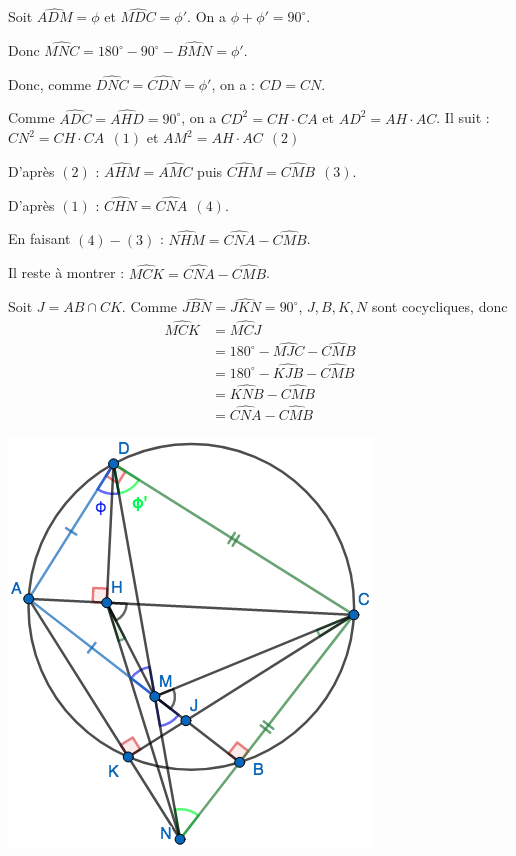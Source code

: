 Soit $\widehat{ADM} = \phi$ et $\widehat{MDC}=\phi'$. On a $\phi + \phi' = 90^\circ$.

Donc $\widehat{MNC} = 180^\circ - 90^\circ - \widehat{BMN} = \phi'$.

Donc, comme $\widehat{DNC} = \widehat{CDN} = \phi'$, on a : $CD = CN$.

Comme $\widehat{ADC} = \widehat{AHD} = 90^\circ$, on a $CD^2=CH\cdot CA$ et $AD^2 = AH\cdot AC$. Il suit : $CN^2 = CH\cdot CA ~~(1)$ et $AM^2 = AH\cdot AC~~(2)$

D'après $(2)$ : $\widehat{AHM} = \widehat{AMC}$ puis $\widehat{CHM} = \widehat{CMB}~~(3)$.

D'après $(1)$ : $\widehat{CHN} = \widehat{CNA}~~(4)$.

En faisant $(4)-(3)$ : $\widehat{NHM} = \widehat{CNA} - \widehat{CMB}$.

Il reste à montrer : $\widehat{MCK} = \widehat{CNA} - \widehat{CMB}$.

Soit $J=AB\cap CK$. Comme $\widehat{JBN} = \widehat{JKN} = 90^\circ$, $J, B, K, N$ sont cocycliques, donc
\begin{align*}
\widehat{MCK}
& = \widehat{MCJ} \\
& = 180^\circ - \widehat{MJC} - \widehat{CMB} \\
& = 180^\circ - \widehat{KJB} - \widehat{CMB} \\
& = \widehat{KNB} - \widehat{CMB} \\
& = \widehat{CNA} - \widehat{CMB}
\end{align*}

\begin{center}
\includegraphics{sol-130.png}
\end{center}